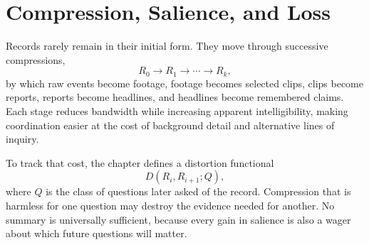 
\chapter{Compression, Salience, and Loss}
\label{ch:ch009}


Records rarely remain in their initial form. They move through successive compressions,
\[
R_0\to R_1\to\cdots\to R_k,
\]
by which raw events become footage, footage becomes selected clips, clips become reports, reports become headlines, and headlines become remembered claims. Each stage reduces bandwidth while increasing apparent intelligibility, making coordination easier at the cost of background detail and alternative lines of inquiry.

To track that cost, the chapter defines a distortion functional
\[
D(R_i,R_{i+1};Q),
\]
where \(Q\) is the class of questions later asked of the record. Compression that is harmless for one question may destroy the evidence needed for another. No summary is universally sufficient, because every gain in salience is also a wager about which future questions will matter.
